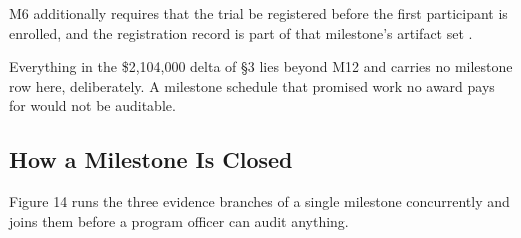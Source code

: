 M6 additionally requires that the trial be registered before the first
participant is enrolled, and the registration record is part of that milestone's
artifact set \cite{ctepiit}.

Everything in the \$2,104,000 delta of \S3 lies beyond M12 and carries no
milestone row here, deliberately. A milestone schedule that promised work no
award pays for would not be auditable.

\subsection{How a Milestone Is Closed}

Figure 14 runs the three evidence branches of a single milestone concurrently
and joins them before a program officer can audit anything.

